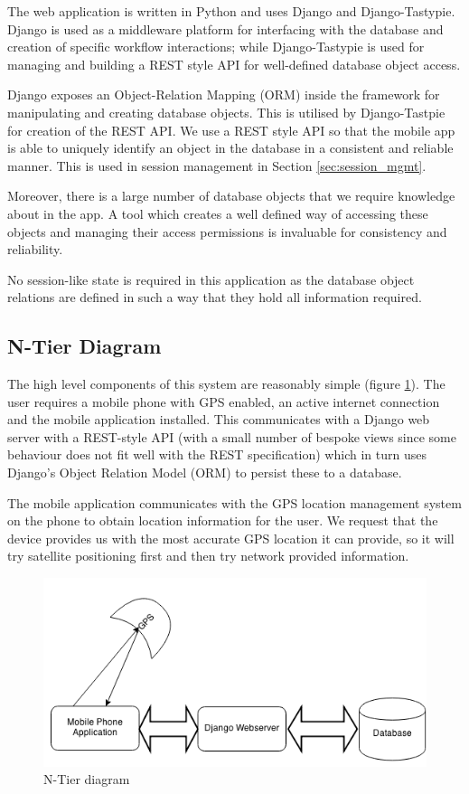 The web application is written in Python and uses Django\cite{django}
and Django-Tastypie\cite{tastypie}. Django is used as a middleware
platform for interfacing with the database and creation of specific
workflow interactions; while Django-Tastypie is used for managing and
building a REST style API for well-defined database object access.

Django exposes an Object-Relation Mapping (ORM) inside the framework
for manipulating and creating database objects. This is utilised by
Django-Tastpie for creation of the REST API. We use a REST style API
so that the mobile app is able to uniquely identify an object in the
database in a consistent and reliable manner. This is used in 
session management in Section \ref{sec:session_mgmt}.

Moreover, there is a large number of database objects that we require
knowledge about in the app. A tool which creates a well defined way of
accessing these objects and managing their access permissions is
invaluable for consistency and reliability.

No session-like state is required in this application as the database
object relations are defined in such a way that they hold all
information required. 

\subsection{N-Tier Diagram}
The high level components of this system are reasonably simple (figure
\ref{NTier}). The
user requires a mobile phone with GPS enabled, an active internet
connection and the mobile application installed. This communicates
with a Django web server with a REST-style API (with a small number of
bespoke views since some behaviour does not fit well with the REST
specification) which in turn uses Django's Object Relation Model (ORM)
to persist these to a database.

The mobile application communicates with the GPS location
management system on the phone to obtain location information for the
user. We request that the device provides us with the most
accurate GPS location it can provide, so it will try satellite
positioning first and then try network provided information.
\begin{figure}[H]
  \centering
  \includegraphics[width=\textwidth]{images/N-tier.png}
  \caption{N-Tier diagram}
  \label{NTier}
\end{figure}

